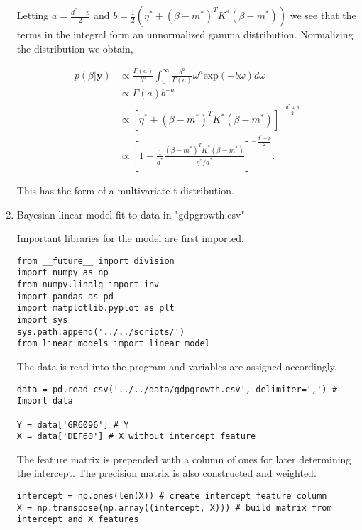 \documentclass[10pt]{article}
\newcommand{\by}{\mathbf{y}}
\begin{document}
\begin{enumerate}[label=(\Alph*)]
        Letting $a = \frac{d^* + p}{2}$ and $b = \frac{1}{2}\left( \eta^* + (\beta - m^*)^T K^* (\beta - m^*) \right)$ we see that the terms in the integral form an unnormalized gamma distribution. Normalizing the distribution we obtain,

        \begin{align*}
          p(\beta | \by) &\propto \frac{\Gamma(a)}{b^a} \int_0^{\infty} \frac{b^a}{\Gamma(a)} \omega^a \text{exp}(-b \omega) d \omega \\
          & \propto \Gamma(a)b^{-a} \\
          & \propto \left [ \eta^* + (\beta - m^*)^T K^* (\beta - m^*) \right]^{-\frac{d^*+p}{2}} \\
          & \propto \left[ 1 + \frac{1}{d^*} \frac{(\beta - m^*)^T K^* (\beta - m^*)}{\eta^*/d^*}\right]^{-\frac{d^*+p}{2}}.
        \end{align*}

        This has the form of a multivariate t distribution. 

      \item Bayesian linear model fit to data in "gdpgrowth.csv"

      Important libraries for the model are first imported.

        \begin{lstlisting}
from __future__ import division
import numpy as np 
from numpy.linalg import inv
import pandas as pd
import matplotlib.pyplot as plt
import sys
sys.path.append('../../scripts/')
from linear_models import linear_model
        \end{lstlisting}

        The data is read into the program and variables are assigned accordingly.

        \begin{lstlisting}
data = pd.read_csv('../../data/gdpgrowth.csv', delimiter=',') # Import data

Y = data['GR6096'] # Y
X = data['DEF60'] # X without intercept feature 
        \end{lstlisting}

        The feature matrix is prepended with a column of ones for later determining the intercept. The precision matrix is also constructed and weighted.

        \begin{lstlisting}
intercept = np.ones(len(X)) # create intercept feature column
X = np.transpose(np.array((intercept, X))) # build matrix from intercept and X features


\end{lstlisting}
\end{enumerate}
\end{document}
